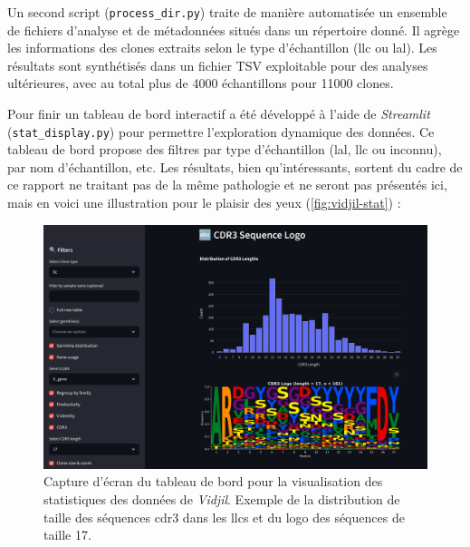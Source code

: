 \vspace{1em}

Un second script (\texttt{process\_dir.py}) traite de manière automatisée un ensemble de fichiers d'analyse et de métadonnées situés dans un répertoire donné. 
Il agrège les informations des clones extraits selon le type d'échantillon (\gls{llc} ou \gls{lal}). Les résultats sont synthétisés dans un fichier TSV exploitable 
pour des analyses ultérieures, avec au total plus de 4000 échantillons pour 11000 clones.

\vspace{1em}

Pour finir un tableau de bord interactif a été développé à l'aide de \textit{Streamlit} (\texttt{stat\_display.py}) pour permettre l'exploration dynamique des données. 
Ce tableau de bord propose des filtres par type d'échantillon (\gls{lal}, \gls{llc} ou inconnu), par nom d'échantillon, etc. Les résultats, bien qu'intéressants, sortent du cadre 
de ce rapport ne traitant pas de la même pathologie et ne seront pas présentés ici, mais en voici une illustration pour le plaisir des yeux (\autoref{fig:vidjil-stat}) :

\begin{figure}[H]
    \centering
    \includegraphics[width=1\textwidth]{images/vidjil_stat.png}
    \caption{
        Capture d'écran du tableau de bord pour la visualisation des statistiques des données de \textit{Vidjil}. 
        Exemple de la distribution de taille des séquences \gls{cdr}3 dans les \glspl{llc} et du logo des séquences 
        de taille 17.
        }
    \label{fig:vidjil-stat}
\end{figure}